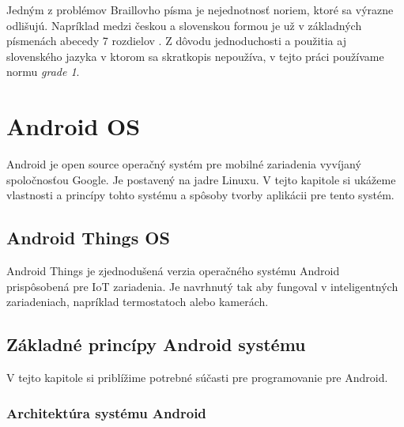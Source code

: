 \documentclass{template/socthesis}
\begin{document}
Jedným z problémov Braillovho písma je nejednotnosť noriem, ktoré sa výrazne odlišujú. Napríklad medzi českou a slovenskou formou je už v základných písmenách abecedy 7 rozdielov \cite{braille-wiki}. Z dôvodu jednoduchosti a použitia aj slovenského jazyka v ktorom sa skratkopis nepoužíva, v tejto práci používame normu \textit{grade 1}. 

\newpage
\chapter{Android OS}
Android je open source operačný systém pre mobilné zariadenia vyvíjaný spoločnosťou Google. Je postavený na jadre Linuxu. V tejto kapitole si ukážeme vlastnosti  a princípy tohto systému a spôsoby tvorby aplikácii pre tento systém.

\section{Android Things OS}
Android Things je zjednodušená verzia operačného systému Android prispôsobená pre IoT zariadenia. Je navrhnutý tak aby fungoval v inteligentných zariadeniach, napríklad termostatoch alebo kamerách.

\section{Základné princípy Android systému}
V tejto kapitole si priblížime potrebné súčasti pre programovanie pre Android.

\subsection*{Architektúra systému Android}
\end{document}
